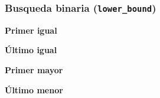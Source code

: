 \subsubsection{Busqueda binaria (\texttt{lower\_bound})}
    \textbf{Primer igual}
    

    \textbf{Último igual}
    

    \textbf{Primer mayor}
    

    \textbf{Último menor}
    

